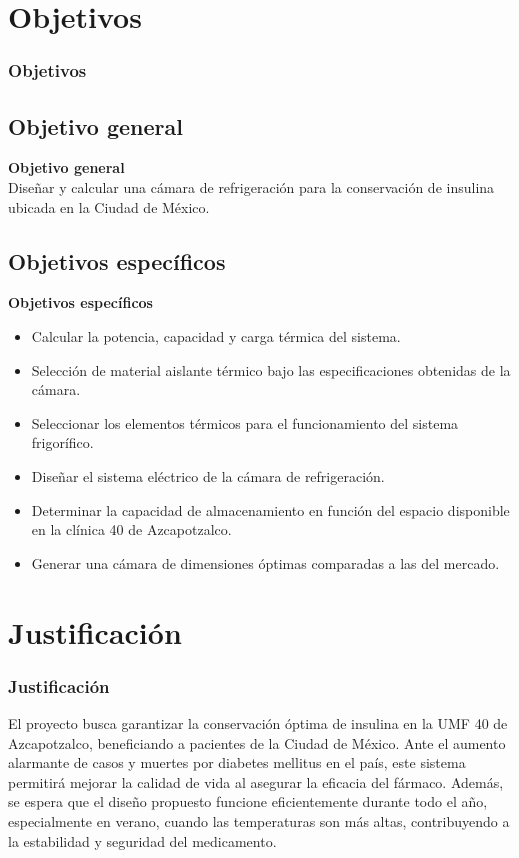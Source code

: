 \documentclass[dvipsnames]{beamer}
\begin{document}
	
	\section{Objetivos}
\begin{frame}
	\frametitle{Objetivos}	
	\fontsize{8}{10}\selectfont
	\justifying	
\subsection{Objetivo general}
\textbf{Objetivo general}\\
Diseñar y calcular una cámara de refrigeración para la conservación de insulina ubicada en la Ciudad de México. 

\subsection{Objetivos específicos}
\textbf{Objetivos específicos}\\

\begin{itemize}
	\item	Calcular la potencia, capacidad y carga térmica del sistema. 
	\item	Selección de material aislante térmico bajo las especificaciones obtenidas de la cámara.
	\item	Seleccionar los elementos térmicos para el funcionamiento del sistema frigorífico.
	\item	Diseñar el sistema eléctrico de la cámara de refrigeración. 
	\item	Determinar la capacidad de almacenamiento en función del espacio disponible en la clínica 40 de Azcapotzalco.
	\item	Generar una cámara de dimensiones óptimas comparadas a las del mercado.
\end{itemize}

\end{frame}

\section{Justificación}
	\begin{frame}
		\frametitle{Justificación}
			\justifying	
		El proyecto busca garantizar la conservación óptima de insulina en la UMF 40 de Azcapotzalco, beneficiando a pacientes de la Ciudad de México. Ante el aumento alarmante de casos y muertes por diabetes mellitus en el país, este sistema permitirá mejorar la calidad de vida al asegurar la eficacia del fármaco. Además, se espera que el diseño propuesto funcione eficientemente durante todo el año, especialmente en verano, cuando las temperaturas son más altas, contribuyendo a la estabilidad y seguridad del medicamento.
		
	\end{frame}
	
\end{document}
